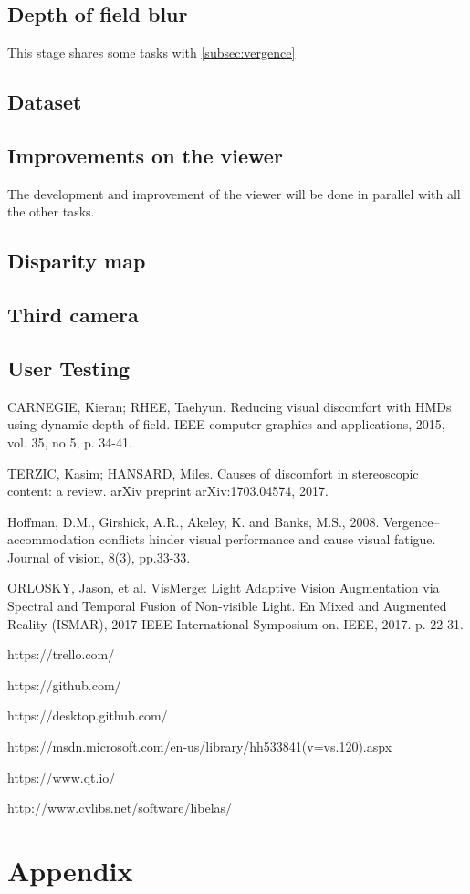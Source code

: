 \documentclass[10pt,a4paper,twocolumn,twoside]{article}
\begin{document}
\subsection{Depth of field blur}
This stage shares some tasks with \ref{subsec:vergence}





\subsection{Dataset}

\subsection{Improvements on the viewer}
The development and improvement of the viewer will be done in parallel with all the other tasks.
\subsection{Disparity map}

\subsection{Third camera}

\subsection{User Testing}


\begin{thebibliography}{11}
CARNEGIE, Kieran; RHEE, Taehyun. Reducing visual discomfort with HMDs using dynamic depth of field. IEEE computer graphics and applications, 2015, vol. 35, no 5, p. 34-41.

TERZIC, Kasim; HANSARD, Miles. Causes of discomfort in stereoscopic content: a review. arXiv preprint arXiv:1703.04574, 2017.

Hoffman, D.M., Girshick, A.R., Akeley, K. and Banks, M.S., 2008. Vergence–accommodation conflicts hinder visual performance and cause visual fatigue. Journal of vision, 8(3), pp.33-33.

ORLOSKY, Jason, et al. VisMerge: Light Adaptive Vision Augmentation via Spectral and Temporal Fusion of Non-visible Light. En Mixed and Augmented Reality (ISMAR), 2017 IEEE International Symposium on. IEEE, 2017. p. 22-31.

https://trello.com/

https://github.com/

https://desktop.github.com/

https://msdn.microsoft.com/en-us/library/hh533841(v=vs.120).aspx

https://www.qt.io/

http://www.cvlibs.net/software/libelas/

\end{thebibliography}

\appendix

\section*{Appendix}
\end{document}

